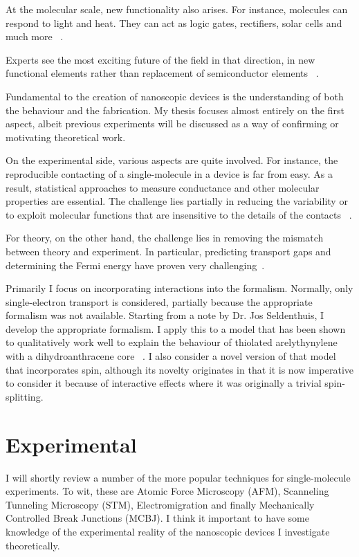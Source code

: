 At the molecular scale, new functionality also arises. For instance, molecules can respond to light and heat. They can act as logic gates, rectifiers, solar cells and much more ~\cite{perrin}. 

Experts see the most exciting future of the field in that direction, in new functional elements rather than replacement of semiconductor elements ~\cite{visions}.

Fundamental to the creation of nanoscopic devices is the understanding of both the behaviour and the fabrication. My thesis focuses almost entirely on the first aspect, albeit previous experiments will be discussed as a way of confirming or motivating theoretical work.

On the experimental side, various aspects are quite involved. For instance, the reproducible contacting of a single-molecule in a device is far from easy. As a result, statistical approaches to measure conductance and other molecular properties are essential. The challenge lies partially in reducing the variability or to exploit molecular functions that are insensitive to the details of the contacts ~\cite{visions}.

For theory, on the other hand, the challenge lies in removing the mismatch between theory and experiment. In particular, predicting transport gaps and determining the Fermi energy have proven very challenging~\cite{perrin}. 

Primarily I focus on incorporating interactions into the formalism. Normally, only single-electron transport is considered, partially because the appropriate formalism  was not available. Starting from a note by Dr. Jos Seldenthuis, I develop the appropriate formalism. I apply this to a model that has been shown to qualitatively work well to explain the behaviour of thiolated arelythynylene with a dihydroanthracene core ~\cite{perrinnano}. I also consider a novel version of that model that incorporates spin, although its novelty originates in that it is now imperative to consider it because of interactive effects where it was originally a trivial spin-splitting. 
\section{Experimental}
I will shortly review a number of the more popular techniques for single-molecule experiments. To wit, these are Atomic Force Microscopy (AFM), Scanneling Tunneling Microscopy (STM), Electromigration and finally Mechanically Controlled Break Junctions (MCBJ). I think it important to have some knowledge of the experimental reality of the nanoscopic devices I investigate theoretically.

